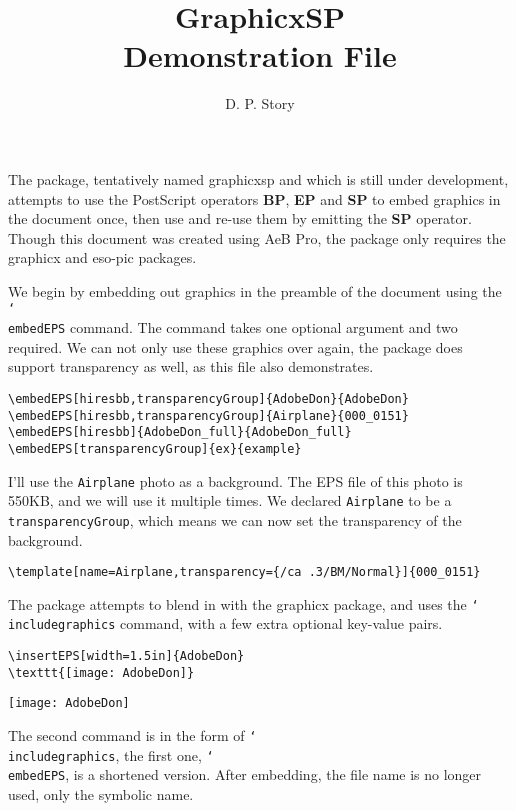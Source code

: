 \documentclass{article}
\title{\textsf{GraphicxSP}\texorpdfstring{\\}{:} Demonstration File}
\author{D. P. Story}
\newcommand{\cs}[1]{\texttt{\char`\\#1}}
\begin{document}
\maketitle

The package, tentatively named \textsf{graphicxsp} and which is
still under development, attempts to use the PostScript operators
\textbf{BP}, \textbf{EP} and \textbf{SP} to embed graphics in the
document once, then use and re-use them by emitting the \textbf{SP}
operator. Though this document was created using \textsf{AeB Pro},
the package only requires the \textsf{graphicx} and \textsf{eso-pic}
packages.

\medskip
We begin by embedding out graphics in the preamble of the document
using the \cs{embedEPS} command. The command takes one optional
argument and two required. We can not only use these graphics over
again, the package does support transparency as well, as this file
also demonstrates.
\begin{small}
\begin{verbatim}
\embedEPS[hiresbb,transparencyGroup]{AdobeDon}{AdobeDon}
\embedEPS[hiresbb,transparencyGroup]{Airplane}{000_0151}
\embedEPS[hiresbb]{AdobeDon_full}{AdobeDon_full}
\embedEPS[transparencyGroup]{ex}{example}
\end{verbatim}
\end{small}

I'll use the \texttt{Airplane} photo as a background. The EPS file
of this photo is 550KB, and we will use it multiple times. We
declared \texttt{Airplane} to be a \texttt{transparencyGroup}, which
means we can now set the transparency of the background.
\begin{small}
\begin{verbatim}
\template[name=Airplane,transparency={/ca .3/BM/Normal}]{000_0151}
\end{verbatim}
\end{small}


The package attempts to blend in with the \textsf{graphicx} package, and uses
the \cs{includegraphics} command, with a few extra optional key-value
pairs.
\begin{small}%
\begin{verbatim}
\insertEPS[width=1.5in]{AdobeDon}
\texttt{[image: AdobeDon]}
\end{verbatim}
\end{small}%



\begin{center}
\texttt{[image: AdobeDon]}
\end{center}
The second command is in the form of \cs{includegraphics}, the first
one, \cs{embedEPS}, is a shortened version. After embedding, the file name is no longer used,
only the symbolic name.
\end{document}
